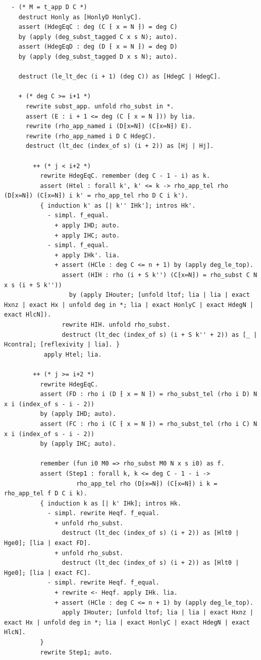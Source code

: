 \begin{latin}
\begin{verbatim}
  - (* M = t_app D C *)
    destruct Honly as [HonlyD HonlyC].
    assert (HdegEqC : deg (C ⁅ x ≔ N ⁆) = deg C)
    by (apply (deg_subst_tagged C x s N); auto).
    assert (HdegEqD : deg (D ⁅ x ≔ N ⁆) = deg D)
    by (apply (deg_subst_tagged D x s N); auto).

    destruct (le_lt_dec (i + 1) (deg C)) as [HdegC | HdegC].

    + (* deg C >= i+1 *)
      rewrite subst_app. unfold rho_subst in *.
      assert (E : i + 1 <= deg (C ⁅ x ≔ N ⁆)) by lia.
      rewrite (rho_app_named i (D⁅x≔N⁆) (C⁅x≔N⁆) E).
      rewrite (rho_app_named i D C HdegC).
      destruct (lt_dec (index_of s) (i + 2)) as [Hj | Hj].

        ++ (* j < i+2 *)
          rewrite HdegEqC. remember (deg C - 1 - i) as k.
          assert (Htel : forall k', k' <= k -> rho_app_tel rho (D⁅x≔N⁆) (C⁅x≔N⁆) i k' = rho_app_tel rho D C i k').
          { induction k' as [| k'' IHk']; intros Hk'.
            - simpl. f_equal.
              + apply IHD; auto.
              + apply IHC; auto.
            - simpl. f_equal.
              + apply IHk'. lia.
              + assert (HCle : deg C <= n + 1) by (apply deg_le_top).
                assert (HIH : rho (i + S k'') (C⁅x≔N⁆) = rho_subst C N x s (i + S k''))
                  by (apply IHouter; [unfold ltof; lia | lia | exact Hxnz | exact Hx | unfold deg in *; lia | exact HonlyC | exact HdegN | exact HlcN]).
                rewrite HIH. unfold rho_subst.
                destruct (lt_dec (index_of s) (i + S k'' + 2)) as [_ | Hcontra]; [reflexivity | lia]. }
           apply Htel; lia.

        ++ (* j >= i+2 *)
          rewrite HdegEqC.
          assert (FD : rho i (D ⁅ x ≔ N ⁆) = rho_subst_tel (rho i D) N x i (index_of s - i - 2))
          by (apply IHD; auto).
          assert (FC : rho i (C ⁅ x ≔ N ⁆) = rho_subst_tel (rho i C) N x i (index_of s - i - 2))
          by (apply IHC; auto).

          remember (fun i0 M0 => rho_subst M0 N x s i0) as f.
          assert (Step1 : forall k, k <= deg C - 1 - i ->
                    rho_app_tel rho (D⁅x≔N⁆) (C⁅x≔N⁆) i k = rho_app_tel f D C i k).
          { induction k as [| k' IHk]; intros Hk.
            - simpl. rewrite Heqf. f_equal.
              + unfold rho_subst.
                destruct (lt_dec (index_of s) (i + 2)) as [Hlt0 | Hge0]; [lia | exact FD].
              + unfold rho_subst.
                destruct (lt_dec (index_of s) (i + 2)) as [Hlt0 | Hge0]; [lia | exact FC].
            - simpl. rewrite Heqf. f_equal.
              + rewrite <- Heqf. apply IHk. lia.
              + assert (HCle : deg C <= n + 1) by (apply deg_le_top).
                apply IHouter; [unfold ltof; lia | lia | exact Hxnz | exact Hx | unfold deg in *; lia | exact HonlyC | exact HdegN | exact HlcN].
          }
          rewrite Step1; auto.


\end{verbatim}
\end{latin}
